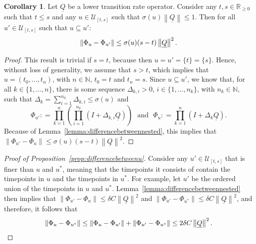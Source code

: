 \documentclass[10pt,a4paper]{paper}
\theoremstyle{definition}
\newtheorem{corollary}[theorem]{Corollary}
\newcommand{\nats}{\mathbb{N}}
\newcommand{\reals}{\mathbb{R}}
\newcommand{\realsnonneg}{\reals_{\geq 0}}
\newcommand{\lrate}{\underline{Q}}
\newcommand{\norm}[1]{\left\lVert #1 \right\rVert}
\newcommand{\coloneqq}{:\!=}
\begin{document}
\begin{corollary}\label{corol:differencebetweennestedintermsofu}
Let $\lrate$ be a lower transition rate operator. Consider any $t,s\in\realsnonneg$ such that $t\leq s$ and any $u\in\mathcal{U}_{[t,s]}$ such that $\sigma(u)\norm{\lrate}\leq 1$. Then for all $u'\in\mathcal{U}_{[t,s]}$ such that $u\subseteq u'$:
\begin{equation*}
\norm{\Phi_u-\Phi_{u'}}\leq\sigma(u)(s-t)\norm{\lrate}^2.\vspace{5pt}
\end{equation*}
\end{corollary}
\begin{proof}
This result is trivial if $s=t$, because then $u=u'=\{t\}=\{s\}$. Hence, without loss of generality, we assume that $s>t$, which implies that $u=(t_0,\dots,t_n)$, with $n\in\nats$, $t_0=t$ and $t_n=s$.
Since $u\subseteq u'$, we know that, for all $k\in\{1,\dots,n\}$, there is some sequence $\Delta_{k,i}> 0$, $i\in\{1,\dots,n_k\}$, with $n_k\in\nats$, such that $\Delta_k=\sum_{i=1}^{n_k}\Delta_{k,i}\leq\sigma(u)$ and
\begin{equation*}
\Phi_{u'}\coloneqq\prod_{k=1}^n\left(\prod_{i=1}^{n_k}(I+\Delta_{k,i}\lrate)\right)
\text{~~and~~}
\Phi_{u}\coloneqq\prod_{k=1}^n(I+\Delta_{k}\lrate).
\end{equation*}
Because of Lemma~\ref{lemma:differencebetweennested}, this implies that $\norm{\Phi_{u'}-\Phi_u}\leq\sigma(u)(s-t)\norm{\lrate}^2$. 
\end{proof}


\begin{proof}[Proof of Proposition~\ref{prop:differencebetweenu}]
Consider any $u'\in\mathcal{U}_{[t,s]}$ that is finer than $u$ and $u^*$, meaning that the timepoints it consists of contain the timepoints in $u$ and the timepoints in $u^*$. For example, let $u'$ be the ordered union of the timepoints in $u$ and $u^*$. Lemma~\ref{lemma:differencebetweennested} then implies that $\norm{\Phi_{u'}-\Phi_u}\leq\delta C\norm{\lrate}^2$ and $\norm{\Phi_{u'}-\Phi_{u^*}}\leq\delta C\norm{\lrate}^2$, and therefore, it follows that
\begin{equation*}
\norm{\Phi_{u}-\Phi_{u^*}}
\leq
\norm{\Phi_{u}-\Phi_{u'}}
+
\norm{\Phi_{u'}-\Phi_{u^*}}
\leq2\delta C\norm{\lrate}^2.\vspace{-10pt}
\end{equation*}
\end{proof}
\end{document}
